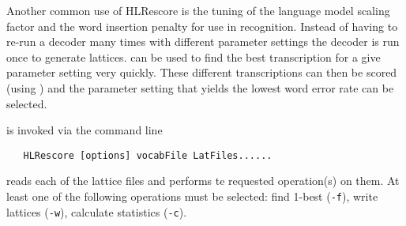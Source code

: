 Another common use of HLRescore is the tuning of the language
model scaling factor and the word insertion penalty for use in
recognition. Instead of having to re-run a decoder many times with
different parameter settings the decoder is run once to generate
lattices.  can be used to find the best transcription
for a give parameter setting very quickly. These different
transcriptions can then be scored (using ) and the
parameter setting that yields the lowest word error rate can be
selected. 




 is invoked via the command line
\begin{verbatim}
   HLRescore [options] vocabFile LatFiles......
\end{verbatim}

 reads each of the lattice files and performs te
requested operation(s) on them. At least one of the following
operations must be selected: find 1-best (\texttt{-f}), write lattices
(\texttt{-w}), calculate statistics (\texttt{-c}).


